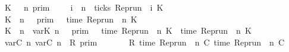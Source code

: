 \begin{isabellebody}
{\isacharbar}\ {\isacartoucheopen}{\isasymlbrakk}\ K\ {\isasymnot}{\isasymUp}\ {\isasymge}\ n\ {\isasymrbrakk}\isactrlsub p\isactrlsub r\isactrlsub i\isactrlsub m\ \ \ {\isacharequal}\ {\isacharbraceleft}{\isasymrho}{\isachardot}\ {\isasymforall}i\ {\isasymge}\ n{\isachardot}\ {\isasymnot}\ ticks\ {\isacharparenleft}{\isacharparenleft}Rep{\isacharunderscore}run\ {\isasymrho}{\isacharparenright}\ i\ K{\isacharparenright}\ {\isacharbraceright}{\isacartoucheclose}\isanewline
{\isacharbar}\ {\isacartoucheopen}{\isasymlbrakk}\ K\ {\isasymDown}\ n\ {\isacharat}\ {\isasymtau}\ {\isasymrbrakk}\isactrlsub p\isactrlsub r\isactrlsub i\isactrlsub m\ {\isacharequal}\ {\isacharbraceleft}{\isasymrho}{\isachardot}\ time\ {\isacharparenleft}{\isacharparenleft}Rep{\isacharunderscore}run\ {\isasymrho}{\isacharparenright}\ n\ K{\isacharparenright}\ {\isacharequal}\ {\isasymtau}\ {\isacharbraceright}{\isacartoucheclose}\isanewline
{\isacharbar}\ {\isacartoucheopen}{\isasymlbrakk}\ K\ {\isasymDown}\ n\ {\isacharat}{\isasymsharp}\ {\isasymlparr}{\isasymtau}\isactrlsub v\isactrlsub a\isactrlsub r{\isacharparenleft}K{\isacharprime}{\isacharcomma}\ n{\isacharprime}{\isacharparenright}\ {\isasymoplus}\ {\isasymdelta}{\isasymtau}{\isasymrparr}\ {\isasymrbrakk}\isactrlsub p\isactrlsub r\isactrlsub i\isactrlsub m\ {\isacharequal}\ {\isacharbraceleft}{\isasymrho}{\isachardot}\ time\ {\isacharparenleft}{\isacharparenleft}Rep{\isacharunderscore}run\ {\isasymrho}{\isacharparenright}\ n\ K{\isacharparenright}\ {\isacharequal}\ time\ {\isacharparenleft}{\isacharparenleft}Rep{\isacharunderscore}run\ {\isasymrho}{\isacharparenright}\ n{\isacharprime}\ K{\isacharprime}{\isacharparenright}\ {\isacharplus}\ {\isasymdelta}{\isasymtau}\ {\isacharbraceright}{\isacartoucheclose}\isanewline
{\isacharbar}\ {\isacartoucheopen}{\isasymlbrakk}\ {\isasymlfloor}{\isasymtau}\isactrlsub v\isactrlsub a\isactrlsub r{\isacharparenleft}C\ n\ {\isasymtau}\isactrlsub v\isactrlsub a\isactrlsub r{\isacharparenleft}C\ n\ {\isasymin}\ R\ {\isasymrbrakk}\isactrlsub p\isactrlsub r\isactrlsub i\isactrlsub m\ {\isacharequal}\isanewline
\ \ \ \ {\isacharbraceleft}\ {\isasymrho}{\isachardot}\ R\ {\isacharparenleft}time\ {\isacharparenleft}{\isacharparenleft}Rep{\isacharunderscore}run\ {\isasymrho}{\isacharparenright}\ n\ C\ time\ {\isacharparenleft}{\isacharparenleft}Rep{\isacharunderscore}run\ {\isasymrho}{\isacharparenright}\ n\ C\ {\isacharbraceright}{\isacartoucheclose}\isanewline

\end{isabellebody}
